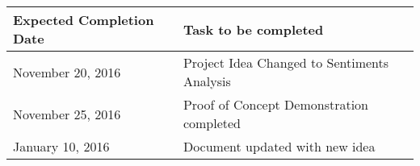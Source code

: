 \documentclass{article}
\begin{document}
		
		\begin{tabular}{|p{5cm}|p{5cm}|}
		\hline
		\textbf{Expected Completion Date}  & \textbf{Task to be completed} \\ \hline
		November 20, 2016 & Project Idea Changed to Sentiments Analysis\\
		November 25, 2016 & Proof of Concept Demonstration completed\\
		January 10, 2016 & Document updated with new idea\\
		\hline
		\end{tabular}
	
	
\end{document}
